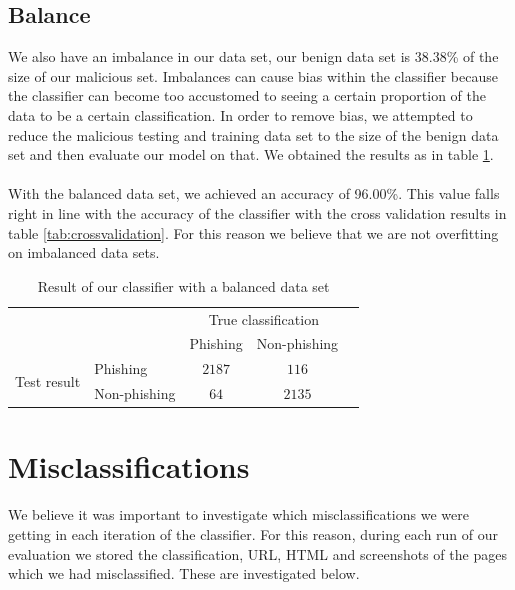 \documentclass[12pt,twoside]{report}
\begin{document}
\subsection{Balance}
We also have an imbalance in our data set, our benign data set is 38.38\% of the size of our malicious set. Imbalances can cause bias within the classifier because the classifier can become too accustomed to seeing a certain proportion of the data to be a certain classification. In order to remove bias, we attempted to reduce the malicious testing and training data set to the size of the benign data set and then evaluate our model on that. We obtained the results as in table \ref{table:balanceddataset}.
\\\\
With the balanced data set, we achieved an accuracy of 96.00\%. This value falls right in line with the accuracy of the classifier with the cross validation results in table \ref{tab:crossvalidation}. For this reason we believe that we are not overfitting on imbalanced data sets.
\begin{table}[h]
\begin{center}
\begin{tabular}{l|l|c|c|c}
\multicolumn{2}{c}{}&\multicolumn{2}{c}{True classification}&\\
\cline{3-4}
\multicolumn{2}{c|}{}&Phishing&Non-phishing\\
\cline{2-4}
\multirow{2}{*}{Test result}& Phishing & $2187$ & $116$\\
\cline{2-4}
& Non-phishing & $64$ & $2135$\\
\cline{2-4}
\end{tabular}
\end{center}
\caption{Result of our classifier with a balanced data set}
\label{table:balanceddataset}
\end{table}
\section{Misclassifications}
We believe it was important to investigate which misclassifications we were getting in each iteration of the classifier. For this reason, during each run of our evaluation we stored the classification, URL, HTML and screenshots of the pages which we had misclassified. These are investigated below.
\end{document}
